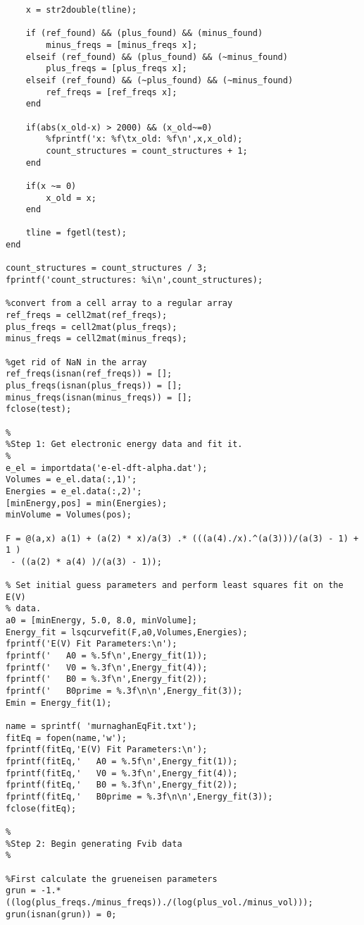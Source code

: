 \documentclass[11pt,letterpaper]{article}
\begin{document}
\begin{spacing}{1.0}
\begin{verbatim}
    x = str2double(tline);
    
    if (ref_found) && (plus_found) && (minus_found)
        minus_freqs = [minus_freqs x];
    elseif (ref_found) && (plus_found) && (~minus_found)
        plus_freqs = [plus_freqs x];
    elseif (ref_found) && (~plus_found) && (~minus_found)
        ref_freqs = [ref_freqs x];        
    end
    
    if(abs(x_old-x) > 2000) && (x_old~=0)
        %fprintf('x: %f\tx_old: %f\n',x,x_old);
        count_structures = count_structures + 1;
    end
    
    if(x ~= 0)
        x_old = x;
    end
    
    tline = fgetl(test);
end

count_structures = count_structures / 3; 
fprintf('count_structures: %i\n',count_structures);

%convert from a cell array to a regular array
ref_freqs = cell2mat(ref_freqs);
plus_freqs = cell2mat(plus_freqs);
minus_freqs = cell2mat(minus_freqs);

%get rid of NaN in the array
ref_freqs(isnan(ref_freqs)) = [];
plus_freqs(isnan(plus_freqs)) = [];
minus_freqs(isnan(minus_freqs)) = [];
fclose(test);

%
%Step 1: Get electronic energy data and fit it.
%
e_el = importdata('e-el-dft-alpha.dat');
Volumes = e_el.data(:,1)';
Energies = e_el.data(:,2)';
[minEnergy,pos] = min(Energies);
minVolume = Volumes(pos);

F = @(a,x) a(1) + (a(2) * x)/a(3) .* (((a(4)./x).^(a(3)))/(a(3) - 1) + 1 )
 - ((a(2) * a(4) )/(a(3) - 1));

% Set initial guess parameters and perform least squares fit on the E(V)
% data.
a0 = [minEnergy, 5.0, 8.0, minVolume];
Energy_fit = lsqcurvefit(F,a0,Volumes,Energies);
fprintf('E(V) Fit Parameters:\n');
fprintf('   A0 = %.5f\n',Energy_fit(1));
fprintf('   V0 = %.3f\n',Energy_fit(4));
fprintf('   B0 = %.3f\n',Energy_fit(2));
fprintf('   B0prime = %.3f\n\n',Energy_fit(3));
Emin = Energy_fit(1);

name = sprintf( 'murnaghanEqFit.txt');
fitEq = fopen(name,'w');
fprintf(fitEq,'E(V) Fit Parameters:\n');
fprintf(fitEq,'   A0 = %.5f\n',Energy_fit(1));
fprintf(fitEq,'   V0 = %.3f\n',Energy_fit(4));
fprintf(fitEq,'   B0 = %.3f\n',Energy_fit(2));
fprintf(fitEq,'   B0prime = %.3f\n\n',Energy_fit(3));
fclose(fitEq);

%
%Step 2: Begin generating Fvib data
%

%First calculate the grueneisen parameters
grun = -1.*((log(plus_freqs./minus_freqs))./(log(plus_vol./minus_vol)));
grun(isnan(grun)) = 0;


\end{verbatim}
\end{spacing}
\end{document}
